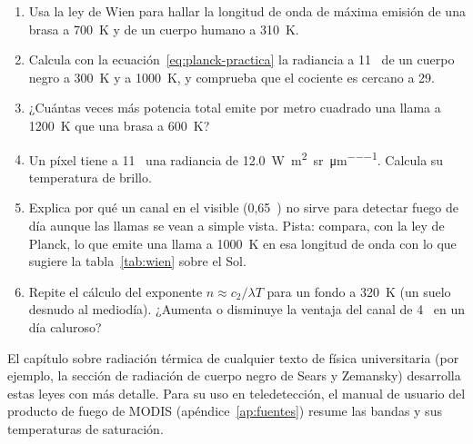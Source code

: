 \ejercicios

\begin{enumerate}
  \item Usa la ley de Wien para hallar la longitud de onda de máxima emisión de una brasa a
  700~K y de un cuerpo humano a 310~K.
  \item Calcula con la ecuación~\eqref{eq:planck-practica} la radiancia a 11~\um{} de un cuerpo
  negro a 300~K y a 1000~K, y comprueba que el cociente es cercano a 29.
  \item ¿Cuántas veces más potencia total emite por metro cuadrado una llama a 1200~K que una
  brasa a 600~K?
  \item Un píxel tiene a 11~\um{} una radiancia de
  \SI{12.0}{\watt\per\square\metre\per\steradian\per\micro\metre}. Calcula su temperatura de
  brillo.
  \item Explica por qué un canal en el visible (0,65~\um) no sirve para detectar fuego de día
  aunque las llamas se vean a simple vista. Pista: compara, con la ley de Planck, lo que emite
  una llama a 1000~K en esa longitud de onda con lo que sugiere la tabla~\ref{tab:wien} sobre
  el Sol.
  \item Repite el cálculo del exponente $n \approx c_2/\lambda T$ para un fondo a 320~K (un
  suelo desnudo al mediodía). ¿Aumenta o disminuye la ventaja del canal de 4~\um{} en un día
  caluroso?
\end{enumerate}

\lecturas

El capítulo sobre radiación térmica de cualquier texto de física universitaria (por ejemplo, la
sección de radiación de cuerpo negro de Sears y Zemansky) desarrolla estas leyes con más
detalle. Para su uso en teledetección, el manual de usuario del producto de fuego de MODIS
(apéndice~\ref{ap:fuentes}) resume las bandas y sus temperaturas de saturación.
